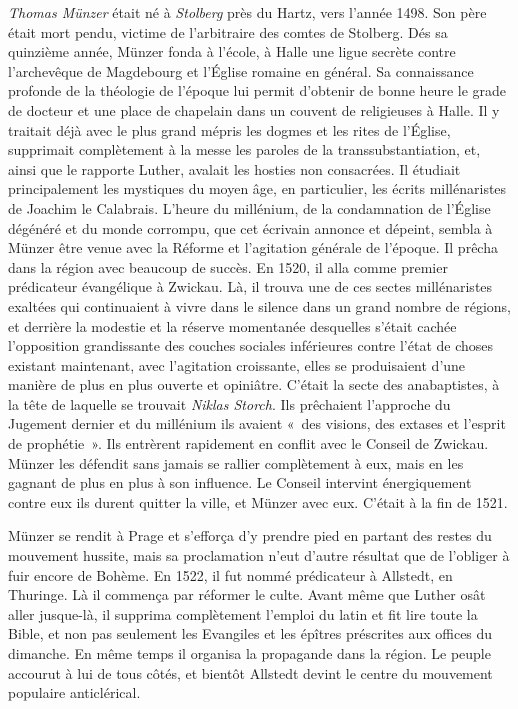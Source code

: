 \documentclass[french,twoside]{book} %
\begin{document}
\emph{Thomas Münzer} était né à \emph{Stolberg} près du Hartz, vers l’année 1498. Son père était mort pendu, victime de l’arbitraire des comtes de Stolberg. Dés sa quinzième année, Münzer fonda à l’école, à Halle une ligue secrète contre l’archevêque de Magdebourg et l’Église romaine en général. Sa connaissance profonde de la théologie de l’époque lui permit d’obtenir de bonne heure le grade de docteur et une place de chapelain dans un couvent de religieuses à Halle. Il y traitait déjà avec le plus grand mépris les dogmes et les rites de l’Église, supprimait complètement à la messe les paroles de la transsubstantiation, et, ainsi que le rapporte Luther, avalait les hosties non consacrées. Il étudiait principalement les mystiques du moyen âge, en particulier, les écrits millénaristes de Joachim le Calabrais. L’heure du millénium, de la condamnation de l’Église dégénéré et du monde corrompu, que cet écrivain annonce et dépeint, sembla à Münzer être venue avec la Réforme et l’agitation générale de l’époque. Il prêcha dans la région avec beaucoup de succès. En 1520, il alla comme premier prédicateur évangélique à Zwickau. Là, il trouva une de ces sectes millénaristes exaltées qui continuaient à vivre dans le silence dans un grand nombre de régions, et derrière la modestie et la réserve momentanée desquelles s’était cachée l’opposition grandissante des couches sociales inférieures contre l’état de choses existant maintenant, avec l’agitation croissante, elles se produisaient d’une manière de plus en plus ouverte et opiniâtre. C’était la secte des anabaptistes, à la tête de laquelle se trouvait \emph{Niklas Storch}. Ils prêchaient l’approche du Jugement dernier et du millénium ils avaient « des visions, des extases et l’esprit de prophétie ». Ils entrèrent rapidement en conflit avec le Conseil de Zwickau. Münzer les défendit sans jamais se rallier complètement à eux, mais en les gagnant de plus en plus à son influence. Le Conseil intervint énergiquement contre eux ils durent quitter la ville, et Münzer avec eux. C’était à la fin de 1521.\par
Münzer se rendit à Prage et s’efforça d’y prendre pied en partant des restes du mouvement hussite, mais sa proclamation n’eut d’autre résultat que de l’obliger à fuir encore de Bohème. En 1522, il fut nommé prédicateur à Allstedt, en Thuringe. Là il commença par réformer le culte. Avant même que Luther osât aller jusque-là, il supprima complètement l’emploi du latin et fit lire toute la Bible, et non pas seulement les Evangiles et les épîtres préscrites aux offices du dimanche. En même temps il organisa la propagande dans la région. Le peuple accourut à lui de tous côtés, et bientôt Allstedt devint le centre du mouvement populaire anticlérical.\par
\end{document}
